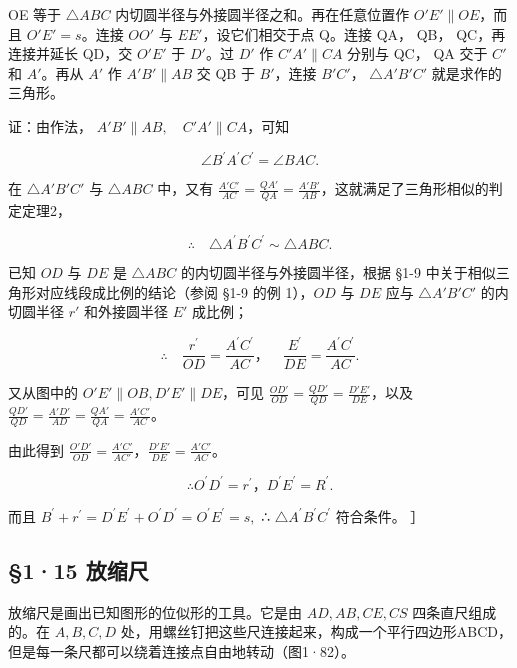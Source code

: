 OE 等于 \(\triangle ABC\) 内切圆半径与外接圆半径之和。再在任意位置作
\(O'E' \parallel OE\)，而且 \(O'E' = s\)。连接 \(OO'\) 与
\(EE'\)，设它们相交于点 Q。连接 QA， QB， QC，再连接并延长 QD，交
\(O'E'\) 于 \(D'\)。过 \(D'\) 作 \(C'A' \parallel CA\) 分别与 QC， QA
交于 \(C'\) 和 \(A'\)。再从 \(A'\) 作 \(A'B' \parallel AB\) 交 QB 于
\(B'\)，连接 \(B'C'\)， \(\triangle A'B'C'\) 就是求作的三角形。

证：由作法， \(A'B'\parallel AB,\quad C'A'\parallel CA\)，可知

\[
\angle B ^ {\prime} A ^ {\prime} C ^ {\prime} = \angle B A C.
\]

在 \(\triangle A'B'C'\) 与 \(\triangle ABC\) 中，又有
\(\frac{A'C'}{AC} = \frac{QA'}{QA} = \frac{A'B'}{AB}\)，这就满足了三角形相似的判定定理2，

\[
\therefore \quad \triangle A ^ {\prime} B ^ {\prime} C ^ {\prime} \sim \triangle A B C.
\]

已知 \(OD\) 与 \(DE\) 是 \(\triangle ABC\)
的内切圆半径与外接圆半径，根据 §1-9
中关于相似三角形对应线段成比例的结论（参阅 §1-9 的例 1），\(OD\) 与
\(DE\) 应与 \(\triangle A'B'C'\) 的内切圆半径 \(r'\) 和外接圆半径 \(E'\)
成比例；

\[
\therefore \quad \frac {r ^ {\prime}}{O D} = \frac {A ^ {\prime} C ^ {\prime}}{A C}\text{，} \quad \frac {E ^ {\prime}}{D E} = \frac {A ^ {\prime} C ^ {\prime}}{A C}.
\]

又从图中的 \(O'E' \parallel OB, D'E' \parallel DE\)，可见
\(\frac{OD'}{OD} = \frac{QD'}{QD} = \frac{D'E'}{DE}\)，以及
\(\frac{QD'}{QD} = \frac{A'D'}{AD} = \frac{QA'}{QA} = \frac{A'C'}{AC}\)。

由此得到
\(\frac{O'D'}{OD} = \frac{A'C'}{AC'}\)，\(\frac{D'E'}{DE} = \frac{A'C'}{AC}\)。

\[
\therefore O ^ {\prime} D ^ {\prime} = r ^ {\prime}\text{，} D ^ {\prime} E ^ {\prime} = R ^ {\prime}.
\]

而且
\(B^{\prime} + r^{\prime} = D^{\prime}E^{\prime} + O^{\prime}D^{\prime} = O^{\prime}E^{\prime} = s,\)
∴ \(\triangle A^{\prime}B^{\prime}C^{\prime}\) 符合条件。 ］

\subsection{§1·15 放缩尺}

放缩尺是画出已知图形的位似形的工具。它是由 \(AD, AB, CE, CS\)
四条直尺组成的。在 \(A, B, C, D\)
处，用螺丝钉把这些尺连接起来，构成一个平行四边形ABCD，但是每一条尺都可以绕着连接点自由地转动（图1·82）。

